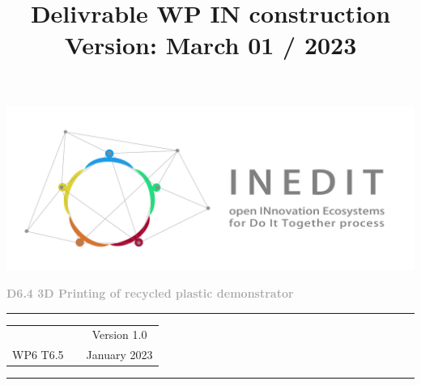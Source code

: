 \documentclass[
  11pt,
]{article}
\title{Delivrable WP IN construction Version: March 01 / 2023}
\author{}
\date{}
\begin{document}
\maketitle

\begin{titlepage}
	\begin{center}

		\vspace{30mm}
		
		\includegraphics[width=\linewidth]{figures/Inedit_horiz.pdf}\\ 
		
		\vfill
		
		\textbf{\Huge{\textcolor{darkgray}{ D6.4 3D Printing of recycled plastic demonstrator }}} \\ 
		
		\vfill
		
		\vspace{60mm} 
		
		
		
      \textcolor{gray}{\rule{\textwidth}{2pt}}
      
		\vspace{5pt}
		\begin{tabular}{ c p{8cm} c }
           & & Version 1.0  \\ 
         WP6 T6.5  & & January 2023   \\ 
      \end{tabular}
		\vspace{5pt} 
		
		\textcolor{gray}{\rule{\textwidth}{2pt}}
		
		
	
		
		\vfill
		
	\end{center}
\end{titlepage}

\newpage
\end{document}
